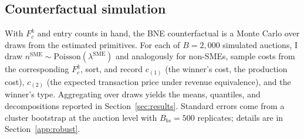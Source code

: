 \subsection{Counterfactual simulation}

With $F_c^k$ and entry counts in hand, the BNE counterfactual is a Monte Carlo over draws from the estimated primitives. For each of $B = 2{,}000$ simulated auctions, I draw $n^{\text{SME}} \sim \mathrm{Poisson}(\lambda^{\text{SME}})$ and analogously for non-SMEs, sample costs from the corresponding $F_c^k$, sort, and record $c_{(1)}$ (the winner's cost, the production cost), $c_{(2)}$ (the expected transaction price under revenue equivalence), and the winner's type. Aggregating over draws yields the means, quantiles, and decompositions reported in Section~\ref{sec:results}. Standard errors come from a cluster bootstrap at the auction level with $B_{bs} = 500$ replicates; details are in Section~\ref{app:robust}.
